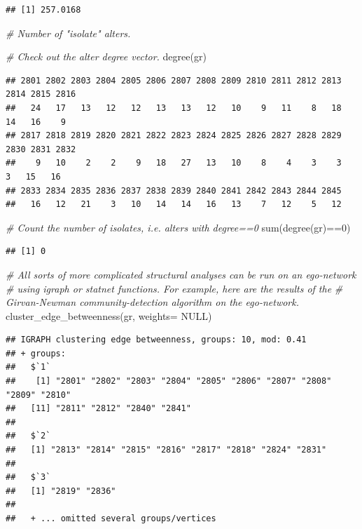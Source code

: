\documentclass[
]{book}
\newenvironment{Shaded}{\begin{snugshade}}{\end{snugshade}}
\newcommand{\AttributeTok}[1]{\textcolor[rgb]{0.77,0.63,0.00}{#1}}
\newcommand{\CommentTok}[1]{\textcolor[rgb]{0.56,0.35,0.01}{\textit{#1}}}
\newcommand{\ConstantTok}[1]{\textcolor[rgb]{0.00,0.00,0.00}{#1}}
\newcommand{\DecValTok}[1]{\textcolor[rgb]{0.00,0.00,0.81}{#1}}
\newcommand{\FunctionTok}[1]{\textcolor[rgb]{0.00,0.00,0.00}{#1}}
\newcommand{\NormalTok}[1]{#1}
\newcommand{\SpecialCharTok}[1]{\textcolor[rgb]{0.00,0.00,0.00}{#1}}
\begin{document}
\begin{verbatim}
## [1] 257.0168
\end{verbatim}

\begin{Shaded}
\begin{Highlighting}[]
\CommentTok{\# Number of "isolate" alters.}

\CommentTok{\# Check out the alter degree vector.}
\FunctionTok{degree}\NormalTok{(gr)}
\end{Highlighting}
\end{Shaded}

\begin{verbatim}
## 2801 2802 2803 2804 2805 2806 2807 2808 2809 2810 2811 2812 2813 2814 2815 2816 
##   24   17   13   12   12   13   13   12   10    9   11    8   18   14   16    9 
## 2817 2818 2819 2820 2821 2822 2823 2824 2825 2826 2827 2828 2829 2830 2831 2832 
##    9   10    2    2    9   18   27   13   10    8    4    3    3    3   15   16 
## 2833 2834 2835 2836 2837 2838 2839 2840 2841 2842 2843 2844 2845 
##   16   12   21    3   10   14   14   16   13    7   12    5   12
\end{verbatim}

\begin{Shaded}
\begin{Highlighting}[]
\CommentTok{\# Count the number of isolates, i.e. alters with degree==0}
\FunctionTok{sum}\NormalTok{(}\FunctionTok{degree}\NormalTok{(gr)}\SpecialCharTok{==}\DecValTok{0}\NormalTok{)}
\end{Highlighting}
\end{Shaded}

\begin{verbatim}
## [1] 0
\end{verbatim}

\begin{Shaded}
\begin{Highlighting}[]
\CommentTok{\# All sorts of more complicated structural analyses can be run on an ego{-}network}
\CommentTok{\# using igraph or statnet functions. For example, here are the results of the}
\CommentTok{\# Girvan{-}Newman community{-}detection algorithm on the ego{-}network.}
\FunctionTok{cluster\_edge\_betweenness}\NormalTok{(gr, }\AttributeTok{weights=} \ConstantTok{NULL}\NormalTok{)}
\end{Highlighting}
\end{Shaded}

\begin{verbatim}
## IGRAPH clustering edge betweenness, groups: 10, mod: 0.41
## + groups:
##   $`1`
##    [1] "2801" "2802" "2803" "2804" "2805" "2806" "2807" "2808" "2809" "2810"
##   [11] "2811" "2812" "2840" "2841"
##   
##   $`2`
##   [1] "2813" "2814" "2815" "2816" "2817" "2818" "2824" "2831"
##   
##   $`3`
##   [1] "2819" "2836"
##   
##   + ... omitted several groups/vertices
\end{verbatim}
\end{document}
